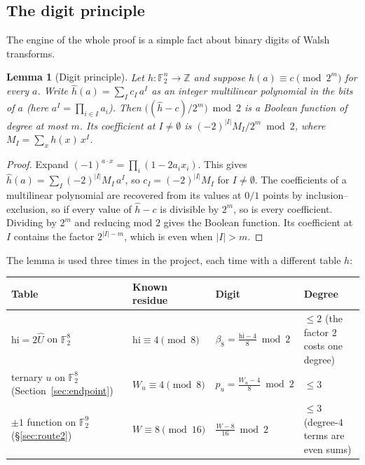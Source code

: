 \documentclass[11pt]{article}
\newtheorem{lemma}[theorem]{Lemma}
\theoremstyle{definition}
\theoremstyle{remark}
\newcommand{\F}{\mathbb{F}}
\newcommand{\Z}{\mathbb{Z}}
\newcommand{\hi}{\mathrm{hi}}
\DeclareRobustCommand{\_}{\textunderscore\allowbreak}
\begin{document}
\subsection{The digit principle}

The engine of the whole proof is a simple fact about binary digits of Walsh transforms.

\begin{lemma}[Digit principle]\label{lem:digit}
Let $h:\F_2^n\to\Z$ and suppose $\widehat h(a)\equiv c\pmod{2^m}$ for every $a$. Write $\widehat h(a)=\sum_I c_I\,a^I$ as an integer multilinear polynomial in the bits of $a$ (here $a^I=\prod_{i\in I}a_i$). Then $\bigl((\widehat h-c)/2^m\bigr)\bmod 2$ is a Boolean function of degree at most $m$. Its coefficient at $I\neq\emptyset$ is $(-2)^{|I|}M_I/2^m \bmod 2$, where $M_I=\sum_x h(x)\,x^I$.
\end{lemma}

\begin{proof}
Expand $(-1)^{a\cdot x}=\prod_i(1-2a_ix_i)$. This gives $\widehat h(a)=\sum_I(-2)^{|I|}M_I\,a^I$, so $c_I=(-2)^{|I|}M_I$ for $I\neq\emptyset$. The coefficients of a multilinear polynomial are recovered from its values at $0/1$ points by inclusion--exclusion, so if every value of $\widehat h-c$ is divisible by $2^m$, so is every coefficient. Dividing by $2^m$ and reducing mod $2$ gives the Boolean function. Its coefficient at $I$ contains the factor $2^{|I|-m}$, which is even when $|I|>m$.
\end{proof}

The lemma is used three times in the project, each time with a different table $h$:

\begin{center}
\begin{tabular}{@{}p{4.1cm}p{2.6cm}p{2.9cm}p{4.6cm}@{}}
\toprule
Table & Known residue & Digit & Degree \\
\midrule
$\hi=2\widehat U$ on $\F_2^8$ & $\hi\equiv4\pmod 8$ & $\beta_8=\frac{\hi-4}{8}\bmod2$ & $\le2$ (the factor $2$ costs one degree) \\
ternary $u$ on $\F_2^8$ (Section~\ref{sec:endpoint}) & $W_u\equiv4\pmod 8$ & $p_u=\frac{W_u-4}{8}\bmod 2$ & $\le3$ \\
$\pm1$ function on $\F_2^9$ (\S\ref{sec:route2}) & $W\equiv8\pmod{16}$ & $\frac{W-8}{16}\bmod 2$ & $\le3$ (degree-$4$ terms are even sums) \\
\bottomrule
\end{tabular}
\end{center}
\end{document}
